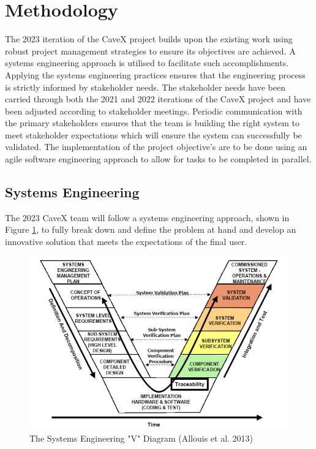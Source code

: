 \section{Methodology}
The 2023 iteration of the CaveX project builds upon the existing work using robust project management strategies to ensure its objectives are achieved. A systems engineering approach is utilised to facilitate such accomplishments. Applying the systems engineering practices ensures that the engineering process is strictly informed by stakeholder needs. The stakeholder needs have been carried through both the 2021 and 2022 iterations of the CaveX project and have been adjusted according to stakeholder meetings. Periodic communication with the primary stakeholders ensures that the team is building the right system to meet stakeholder expectations which will ensure the system can successfully be validated. The implementation of the project objective's are to be done using an agile software engineering approach to allow for tasks to be completed in parallel.

\subsection{Systems Engineering}
The 2023 CaveX team will follow a systems engineering approach, shown in Figure \ref{fig:systemsVdiagram}, to fully break down and define the problem at hand and develop an innovative solution that meets the expectations of the final user.

\begin{figure}[H]
    \centering
    \includegraphics[scale=0.5]{images/The-Systems-Engineering-V-Diagram.png}
    \caption{The Systems Engineering "V" Diagram (Allouis et al. 2013)}
    \label{fig:systemsVdiagram}
\end{figure}

